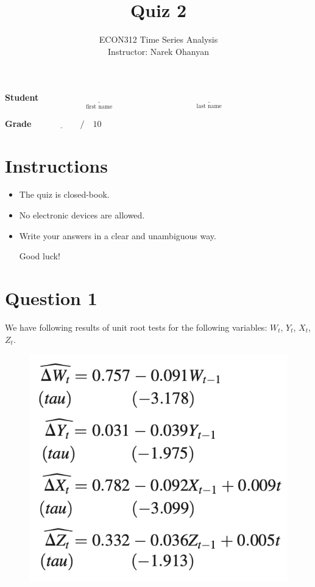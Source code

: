 \documentclass[12pt]{article}
\title{\textbf{Quiz 2}}
\author{ECON312 Time Series Analysis \\ Instructor: Narek Ohanyan}
\date{}
\begin{document}
\maketitle

\vspace{1cm}

\textbf{Student} $ \qquad \underset{\text{first name}}{\underline{\hspace{4cm}}} \quad \underset{\text{last name}}{\underline{\hspace{6cm}}}  $

\bigskip
\textbf{Grade} $ \qquad \underline{\hspace{1cm}} \quad / \quad 10 $


\vspace{1cm}

\section*{Instructions}

\begin{itemize}
    \item The quiz is closed-book.
    \item No electronic devices are allowed.
    \item Write your answers in a clear and unambiguous way.

    Good luck!
\end{itemize}


\newpage

\section*{Question 1 }

We have following results of unit root tests for the following variables: $ W_{t} $, $ Y_{t} $, $ X_{t} $, $ Z_{t} $.

\begin{figure}[H]
    \centering
    \includegraphics[width=0.4\linewidth]{fig/unit-root-equations.png}
\end{figure}
\end{document}

